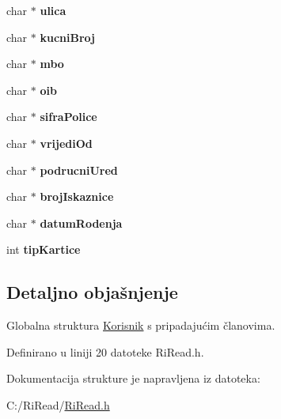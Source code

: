\begin{DoxyCompactItemize}
\item 
\hypertarget{struct_korisnik_ad44b443f72bfd74ba3ea22b31fc0c59d}{}char $\ast$ {\bfseries ulica}\label{struct_korisnik_ad44b443f72bfd74ba3ea22b31fc0c59d}

\item 
\hypertarget{struct_korisnik_ad96f9e2bde5f93dffc9495974bf7052a}{}char $\ast$ {\bfseries kucni\+Broj}\label{struct_korisnik_ad96f9e2bde5f93dffc9495974bf7052a}

\item 
\hypertarget{struct_korisnik_a9103033ec531bdc90a3eb4679ed2b181}{}char $\ast$ {\bfseries mbo}\label{struct_korisnik_a9103033ec531bdc90a3eb4679ed2b181}

\item 
\hypertarget{struct_korisnik_acb74149e9f837ad28c518cc6f9b8bf38}{}char $\ast$ {\bfseries oib}\label{struct_korisnik_acb74149e9f837ad28c518cc6f9b8bf38}

\item 
\hypertarget{struct_korisnik_a949f95fb092f692ce1f58123ad9ca045}{}char $\ast$ {\bfseries sifra\+Police}\label{struct_korisnik_a949f95fb092f692ce1f58123ad9ca045}

\item 
\hypertarget{struct_korisnik_a6c52760abba9eff7473fc477140588b9}{}char $\ast$ {\bfseries vrijedi\+Od}\label{struct_korisnik_a6c52760abba9eff7473fc477140588b9}

\item 
\hypertarget{struct_korisnik_a43eb2689960f1e6692521da0572be44a}{}char $\ast$ {\bfseries podrucni\+Ured}\label{struct_korisnik_a43eb2689960f1e6692521da0572be44a}

\item 
\hypertarget{struct_korisnik_a558ca6f01d8d46a7600a9be9a89451aa}{}char $\ast$ {\bfseries broj\+Iskaznice}\label{struct_korisnik_a558ca6f01d8d46a7600a9be9a89451aa}

\item 
\hypertarget{struct_korisnik_a339ad767e652eac37865c96e74954ea1}{}char $\ast$ {\bfseries datum\+Rodenja}\label{struct_korisnik_a339ad767e652eac37865c96e74954ea1}

\item 
\hypertarget{struct_korisnik_a5faad726de920928b97d80c154c27765}{}int {\bfseries tip\+Kartice}\label{struct_korisnik_a5faad726de920928b97d80c154c27765}

\end{DoxyCompactItemize}


\subsection{Detaljno objašnjenje}
Globalna struktura \hyperlink{struct_korisnik}{Korisnik} s pripadajućim članovima. 

Definirano u liniji 20 datoteke Ri\+Read.\+h.



Dokumentacija strukture je napravljena iz datoteka\+: \begin{DoxyCompactItemize}
\item 
C\+:/\+Ri\+Read/\hyperlink{_ri_read_8h}{Ri\+Read.\+h}\end{DoxyCompactItemize}
